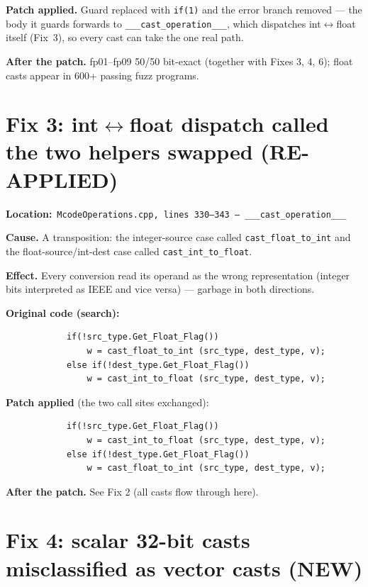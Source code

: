 \documentclass[11pt,a4paper]{report}
\newcommand{\filepath}[1]{\noindent\textbf{Location:}\ \texttt{#1}\par}
\begin{document}
\textbf{Patch applied.} Guard replaced with \texttt{if(1)} and the error
branch removed --- the body it guards forwards to
\texttt{\_\_\_cast\_operation\_\_\_}, which dispatches
int$\leftrightarrow$float itself (Fix~3), so every cast can take the one
real path.

\textbf{After the patch.} fp01--fp09 50/50 bit-exact (together with Fixes
3, 4, 6); float casts appear in 600+ passing fuzz programs.

\section{Fix 3: int$\leftrightarrow$float dispatch called the two helpers swapped (RE-APPLIED)}

\filepath{McodeOperations.cpp, lines 330--343 --- \_\_\_cast\_operation\_\_\_}

\textbf{Cause.} A transposition: the integer-source case called
\texttt{cast\_float\_to\_int} and the float-source/int-dest case called
\texttt{cast\_int\_to\_float}.

\textbf{Effect.} Every conversion read its operand as the wrong
representation (integer bits interpreted as IEEE and vice versa) ---
garbage in both directions.

\textbf{Original code (search):}
\begin{lstlisting}
            if(!src_type.Get_Float_Flag())
                w = cast_float_to_int (src_type, dest_type, v);
            else if(!dest_type.Get_Float_Flag())
                w = cast_int_to_float (src_type, dest_type, v);
\end{lstlisting}

\textbf{Patch applied} (the two call sites exchanged):
\begin{lstlisting}
            if(!src_type.Get_Float_Flag())
                w = cast_int_to_float (src_type, dest_type, v);
            else if(!dest_type.Get_Float_Flag())
                w = cast_float_to_int (src_type, dest_type, v);
\end{lstlisting}

\textbf{After the patch.} See Fix 2 (all casts flow through here).

\section{Fix 4: scalar 32-bit casts misclassified as vector casts (NEW)}
\end{document}
